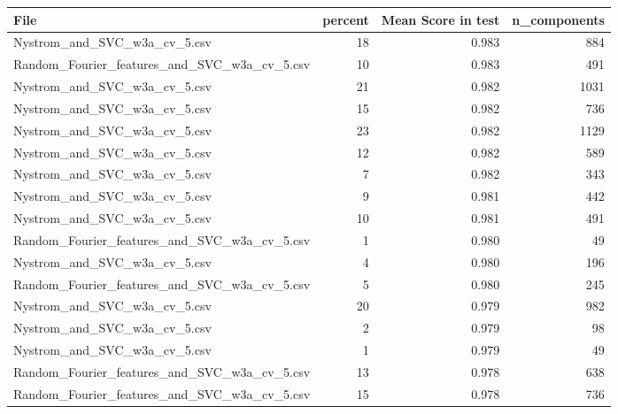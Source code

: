 \begin{tabularx}{\textwidth}{lrrr}
\toprule
                                        File &  percent &  Mean Score in test &  n\_components \\
\midrule
                Nystrom\_and\_SVC\_w3a\_cv\_5.csv &       18 &               0.983 &           884 \\
Random\_Fourier\_features\_and\_SVC\_w3a\_cv\_5.csv &       10 &               0.983 &           491 \\
                Nystrom\_and\_SVC\_w3a\_cv\_5.csv &       21 &               0.982 &          1031 \\
                Nystrom\_and\_SVC\_w3a\_cv\_5.csv &       15 &               0.982 &           736 \\
                Nystrom\_and\_SVC\_w3a\_cv\_5.csv &       23 &               0.982 &          1129 \\
                Nystrom\_and\_SVC\_w3a\_cv\_5.csv &       12 &               0.982 &           589 \\
                Nystrom\_and\_SVC\_w3a\_cv\_5.csv &        7 &               0.982 &           343 \\
                Nystrom\_and\_SVC\_w3a\_cv\_5.csv &        9 &               0.981 &           442 \\
                Nystrom\_and\_SVC\_w3a\_cv\_5.csv &       10 &               0.981 &           491 \\
Random\_Fourier\_features\_and\_SVC\_w3a\_cv\_5.csv &        1 &               0.980 &            49 \\
                Nystrom\_and\_SVC\_w3a\_cv\_5.csv &        4 &               0.980 &           196 \\
Random\_Fourier\_features\_and\_SVC\_w3a\_cv\_5.csv &        5 &               0.980 &           245 \\
                Nystrom\_and\_SVC\_w3a\_cv\_5.csv &       20 &               0.979 &           982 \\
                Nystrom\_and\_SVC\_w3a\_cv\_5.csv &        2 &               0.979 &            98 \\
                Nystrom\_and\_SVC\_w3a\_cv\_5.csv &        1 &               0.979 &            49 \\
Random\_Fourier\_features\_and\_SVC\_w3a\_cv\_5.csv &       13 &               0.978 &           638 \\
Random\_Fourier\_features\_and\_SVC\_w3a\_cv\_5.csv &       15 &               0.978 &           736 \\

\end{tabularx}

